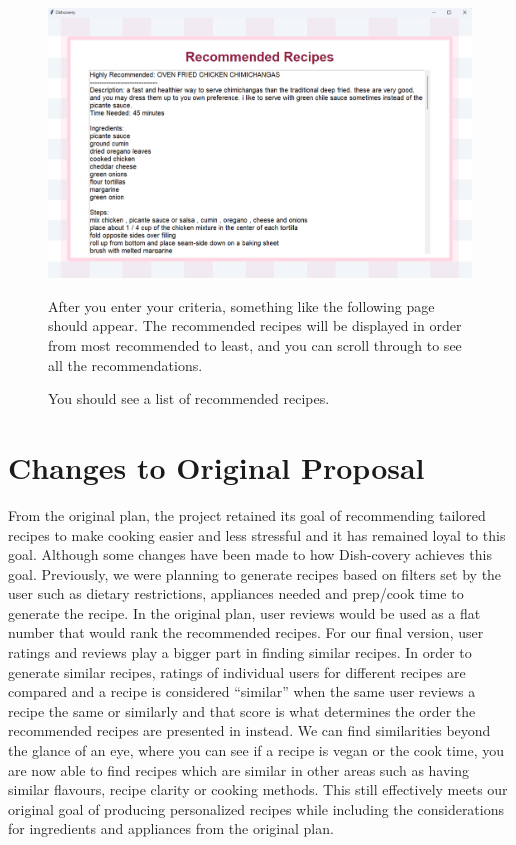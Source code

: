 \documentclass[fontsize=11pt]{article}
\begin{document}
\begin{figure}
    \centering
    \includegraphics[width=0.8\linewidth]{image2.png}
    \caption{You should see a list of recommended recipes.}
    \label{fig:enter-label}
    \begin{flushleft}
        After you enter your criteria, something like the following page should appear. The recommended recipes will be displayed in order from most recommended to least, and you can scroll through to see all the recommendations.
    \end{flushleft}
\end{figure}

\newpage
\vfill
\section{Changes to Original Proposal}
From the original plan, the project retained its goal of recommending tailored recipes to make cooking easier and less stressful and it has remained loyal to this goal. Although some changes have been made to how Dish-covery achieves this goal. Previously, we were planning to generate recipes based on filters set by the user such as dietary restrictions, appliances needed and prep/cook time to generate the recipe. In the original plan, user reviews would be used as a flat number that would rank the recommended recipes. For our final version, user ratings and reviews play a bigger part in finding similar recipes. In order to generate similar recipes, ratings of individual users for different recipes are compared and a recipe is considered “similar” when the same user reviews a recipe the same or similarly and that score is what determines the order the recommended recipes are presented in instead. We can find similarities beyond the glance of an eye, where you can see if a recipe is vegan or the cook time, you are now able to find recipes which are similar in other areas such as having similar flavours, recipe clarity or cooking methods. This still effectively meets our original goal of producing personalized recipes while including the considerations for ingredients and appliances from the original plan. 
\end{document}
